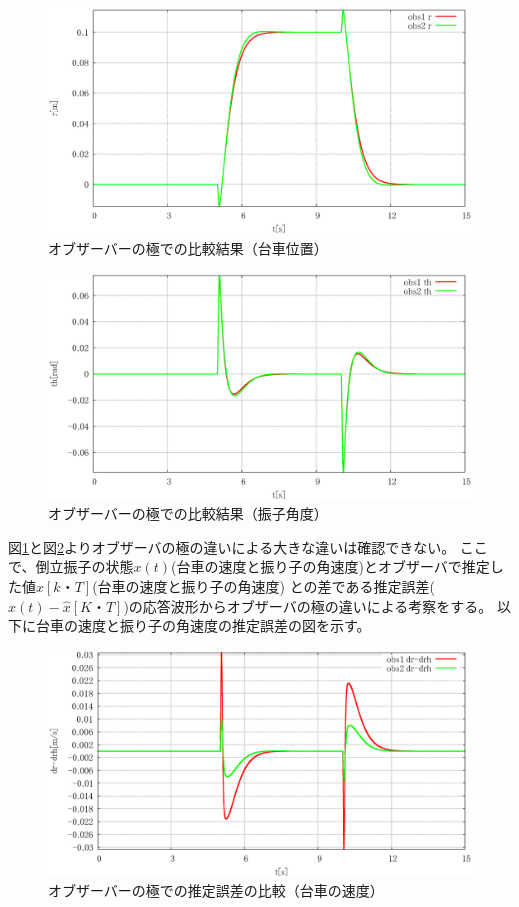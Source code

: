 	\begin{figure}[H]
		\centering
		\includegraphics[width=0.8\linewidth]{gazo/simulation_obs_compare_R.eps}
		\caption{オブザーバーの極での比較結果（台車位置）}
		\label{image:simulation_obs_r}
	\end{figure}
	\begin{figure}[H]
		\centering
		\includegraphics[width=0.8\linewidth]{gazo/simulation_obs_compare_THETA.eps}
		\caption{オブザーバーの極での比較結果（振子角度）}
		\label{image:simulation_obs_theta}
	\end{figure} 
	図\ref{image:simulation_obs_r}と図\ref{image:simulation_obs_theta}よりオブザーバの極の違いによる大きな違いは確認できない。
	ここで、倒立振子の状態$x(t)$(台車の速度と振り子の角速度)とオブザーバで推定した値$\hat{x}[k・T]$(台車の速度と振り子の角速度)
	との差である推定誤差($x(t)-\hat{x}[K・T]$)の応答波形からオブザーバの極の違いによる考察をする。
	以下に台車の速度と振り子の角速度の推定誤差の図を示す。
	\begin{figure}[H]
		\centering
		\includegraphics[width=0.8\linewidth]{gazo/simulation_obs_compare_RminusRH.eps}
		\caption{オブザーバーの極での推定誤差の比較（台車の速度）}
		\label{image:simulation_obs_rminusrh}
	\end{figure}
